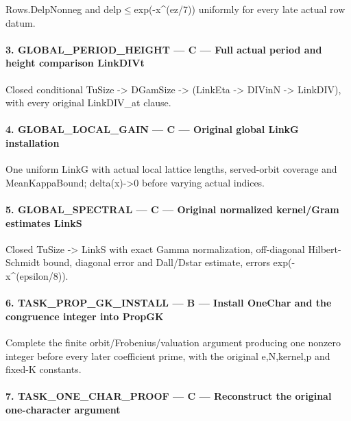 Rows.DelpNonneg and delp$\le$exp(-x\textasciicircum{}(ez/\allowbreak{}7)) uniformly for every late actual row datum.

\paragraph{3. GLOBAL\_\allowbreak{}PERIOD\_\allowbreak{}HEIGHT — C — Full actual period and height comparison LinkDIVt}

Closed conditional TuSize -> DGamSize -> (LinkEta -> DIVinN -> LinkDIV), with every original LinkDIV\_\allowbreak{}at clause.

\paragraph{4. GLOBAL\_\allowbreak{}LOCAL\_\allowbreak{}GAIN — C — Original global LinkG installation}

One uniform LinkG with actual local lattice lengths, served-orbit coverage and MeanKappaBound; delta(x)->0 before varying actual indices.

\paragraph{5. GLOBAL\_\allowbreak{}SPECTRAL — C — Original normalized kernel/\allowbreak{}Gram estimates LinkS}

Closed TuSize -> LinkS with exact Gamma normalization, off-diagonal Hilbert-Schmidt bound, diagonal error and Dall/\allowbreak{}Dstar estimate, errors exp(-x\textasciicircum{}(epsilon/\allowbreak{}8)).

\paragraph{6. TASK\_\allowbreak{}PROP\_\allowbreak{}GK\_\allowbreak{}INSTALL — B — Install OneChar and the congruence integer into PropGK}

Complete the finite orbit/\allowbreak{}Frobenius/\allowbreak{}valuation argument producing one nonzero integer before every later coefficient prime, with the original e,N,kernel,p and fixed-K constants.

\paragraph{7. TASK\_\allowbreak{}ONE\_\allowbreak{}CHAR\_\allowbreak{}PROOF — C — Reconstruct the original one-character argument}

